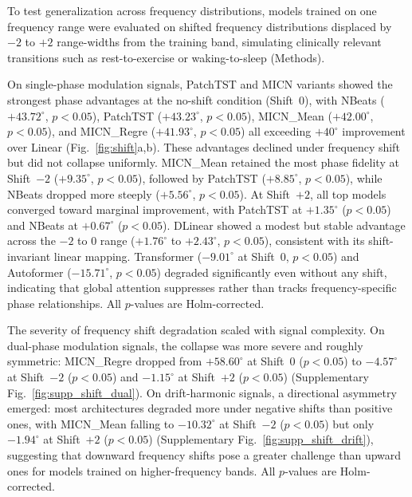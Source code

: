 To test generalization across frequency distributions, models trained on one frequency range were evaluated on shifted frequency distributions displaced by $-2$ to $+2$ range-widths from the training band, simulating clinically relevant transitions such as rest-to-exercise or waking-to-sleep (Methods).

On single-phase modulation signals, PatchTST and MICN variants showed the strongest phase advantages at the no-shift condition (Shift~0), with NBeats ($+43.72^{\circ}$, $p < 0.05$), PatchTST ($+43.23^{\circ}$, $p < 0.05$), MICN\_Mean ($+42.00^{\circ}$, $p < 0.05$), and MICN\_Regre ($+41.93^{\circ}$, $p < 0.05$) all exceeding $+40^{\circ}$ improvement over Linear (Fig.~\ref{fig:shift}a,b). These advantages declined under frequency shift but did not collapse uniformly. MICN\_Mean retained the most phase fidelity at Shift~$-2$ ($+9.35^{\circ}$, $p < 0.05$), followed by PatchTST ($+8.85^{\circ}$, $p < 0.05$), while NBeats dropped more steeply ($+5.56^{\circ}$, $p < 0.05$). At Shift~$+2$, all top models converged toward marginal improvement, with PatchTST at $+1.35^{\circ}$ ($p < 0.05$) and NBeats at $+0.67^{\circ}$ ($p < 0.05$). DLinear showed a modest but stable advantage across the $-2$ to $0$ range ($+1.76^{\circ}$ to $+2.43^{\circ}$, $p < 0.05$), consistent with its shift-invariant linear mapping. Transformer ($-9.01^{\circ}$ at Shift~0, $p < 0.05$) and Autoformer ($-15.71^{\circ}$, $p < 0.05$) degraded significantly even without any shift, indicating that global attention suppresses rather than tracks frequency-specific phase relationships. All $p$-values are Holm-corrected.

The severity of frequency shift degradation scaled with signal complexity. On dual-phase modulation signals, the collapse was more severe and roughly symmetric: MICN\_Regre dropped from $+58.60^{\circ}$ at Shift~0 ($p < 0.05$) to $-4.57^{\circ}$ at Shift~$-2$ ($p < 0.05$) and $-1.15^{\circ}$ at Shift~$+2$ ($p < 0.05$) (Supplementary Fig.~\ref{fig:supp_shift_dual}). On drift-harmonic signals, a directional asymmetry emerged: most architectures degraded more under negative shifts than positive ones, with MICN\_Mean falling to $-10.32^{\circ}$ at Shift~$-2$ ($p < 0.05$) but only $-1.94^{\circ}$ at Shift~$+2$ ($p < 0.05$) (Supplementary Fig.~\ref{fig:supp_shift_drift}), suggesting that downward frequency shifts pose a greater challenge than upward ones for models trained on higher-frequency bands. All $p$-values are Holm-corrected.

